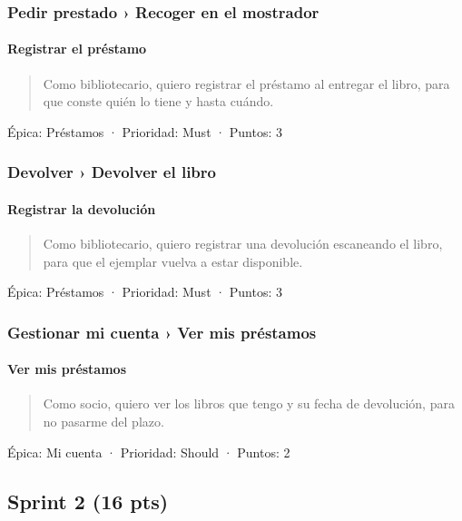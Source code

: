 \documentclass[11pt,a4paper]{article}
\begin{document}
\subsubsection*{Pedir prestado › Recoger en el mostrador}

\paragraph*{Registrar el préstamo}

\begin{quote}
Como bibliotecario, quiero registrar el préstamo al entregar el libro, para que conste quién lo tiene y hasta cuándo.
\end{quote}

Épica: Préstamos · Prioridad: Must · Puntos: 3

\subsubsection*{Devolver › Devolver el libro}

\paragraph*{Registrar la devolución}

\begin{quote}
Como bibliotecario, quiero registrar una devolución escaneando el libro, para que el ejemplar vuelva a estar disponible.
\end{quote}

Épica: Préstamos · Prioridad: Must · Puntos: 3

\subsubsection*{Gestionar mi cuenta › Ver mis préstamos}

\paragraph*{Ver mis préstamos}

\begin{quote}
Como socio, quiero ver los libros que tengo y su fecha de devolución, para no pasarme del plazo.
\end{quote}

Épica: Mi cuenta · Prioridad: Should · Puntos: 2

\subsection*{Sprint 2 (16 pts)}
\end{document}
